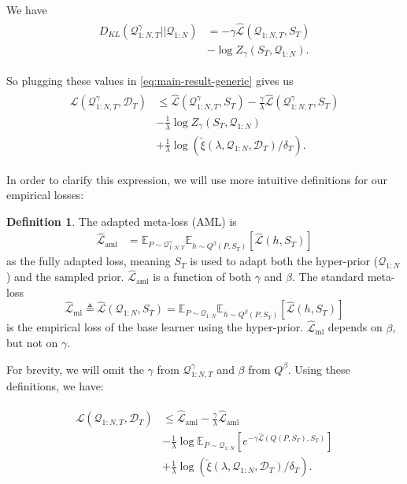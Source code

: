 \documentclass{article} %
\theoremstyle{definition}
\newtheorem{defn}{Definition}[section]
\begin{document}
We have 
\begin{align*} 
\begin{split}
D_{KL}(\mathcal{Q}^{\gamma}_{1:N,T}||\mathcal{Q}_{1:N})&=
-\gamma\hat{\mathcal{L}}(\mathcal{Q}_{1:N,T}, S_T)\\
&-\log Z_\gamma(S_T, \mathcal{Q}_{1:N}) .
\end{split}
\end{align*}

So plugging these values in \eqref{eq:main-result-generic} gives us
\begin{align*} 
\begin{split}
\mathcal{L}(\mathcal{Q}^{\gamma}_{1:N,T}, \mathcal{D}_T) & \leq \hat{\mathcal{L}}(\mathcal{Q}^{\gamma}_{1:N,T}, S_T) -\frac{\gamma}{\lambda}\hat{\mathcal{L}}(\mathcal{Q}^{\gamma}_{1:N,T}, S_T) \\ &- \frac{1}{\lambda}\log Z_\gamma(S_T, \mathcal{Q}_{1:N})\\ &+\frac{1}{\lambda}\log\left (\tilde{\xi}(\lambda,\mathcal{Q}_{1:N},\mathcal{D}_T)/\delta_T\right ) .
\end{split}
\end{align*}

In order to clarify this expression, we will use more intuitive definitions for our empirical losses:
\begin{defn}
	The adapted meta-loss (AML) is  
	\begin{align*} 
	\hat{\mathcal{L}}_{\mathrm{aml}} 
	&=\mathbb{E}_{P\sim \mathcal{Q}^{\gamma}_{1:N,T}}\mathbb{E}_{h\sim Q^{\beta}(P,S_T)}\left [\hat{\mathcal{L}}(h, S_T)\right ]
	\end{align*} 
	as the fully adapted loss, meaning $S_T$ is used to adapt both the hyper-prior ($\mathcal{Q}_{1:N}$) and the sampled prior. $\hat{\mathcal{L}}_{\mathrm{aml}}$ is a function of both $\gamma$ and $\beta$. The standard meta-loss 
	$$
	\hat{\mathcal{L}}_{\mathrm{ml}}\triangleq \hat{\mathcal{L}}(\mathcal{Q}_{1:N}, S_T)=\mathbb{E}_{P\sim \mathcal{Q}_{1:N}}\mathbb{E}_{h\sim Q^{\beta}(P,S_T)}\left [\hat{\mathcal{L}}(h, S_T)\right ]
	$$ 
	is the empirical loss of the base learner using the hyper-prior. 
	$\hat{\mathcal{L}}_{\mathrm{ml}}$ depends on $\beta$, but not on $\gamma$.
\end{defn}

For brevity, we will omit the $\gamma$ from $\mathcal{Q}^{\gamma}_{1:N,T}$ and $\beta$ from $Q^{\beta}$. Using these definitions, we have:

\begin{align*} 
\begin{split}
\mathcal{L}(\mathcal{Q}_{1:N,T}, \mathcal{D}_T) &\leq \hat{\mathcal{L}}_{\mathrm{aml}} -\frac{\gamma}{\lambda}\hat{\mathcal{L}}_{\mathrm{aml}} \\
&- \frac{1}{\lambda}\log \mathbb{E}_{P\sim \mathcal{Q}_{1:N}}\left [e^{-\gamma\hat{\mathcal{L}}(Q(P,S_T),S_T)}\right ]\\
&+\frac{1}{\lambda}\log\left (\tilde{\xi}(\lambda,\mathcal{Q}_{1:N},\mathcal{D}_T)/\delta_T\right ) .
\end{split}
\end{align*}
\end{document}
